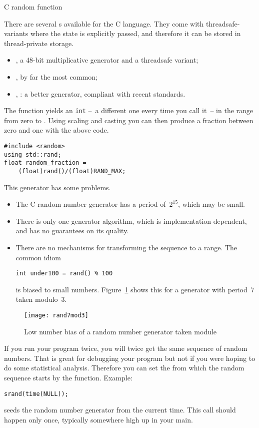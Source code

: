  {C random function}
\label{sec:crand}

There are several
s
available
for the C language.
They come with threadsafe-variants where the state is explicitly passed,
and therefore it can be stored in thread-private storage.
\begin{itemize}
\item {},  a 48-bit multiplicative generator
  and a threadsafe variant;
\item {},  by far the most common;
\item {}, : a better generator, compliant
  with recent  standards.
\end{itemize}

The function  yields an \lstinline{int}
--~a different one every time you call it~--
in the range from zero to .
Using scaling and casting you can then produce a fraction between zero
and one with the above code.
%
\begin{lstlisting}
#include <random>
using std::rand;
float random_fraction =
    (float)rand()/(float)RAND_MAX;
\end{lstlisting}
%

This generator has some problems.

\begin{itemize}
\item The C random number generator has a period of~$2^{15}$, which may be small.
\item There is only one generator algorithm, which is implementation-dependent,
  and has no guarantees on its quality.
\item There are no mechanisms for transforming the sequence to a range.
  The common idiom
\begin{lstlisting}
int under100 = rand() % 100
\end{lstlisting}
is biased to small numbers. Figure~\ref{fig:rand7mod3} shows this
for a generator with period~7 taken modulo~3.
\end{itemize}

\begin{figure}[t]
  \texttt{[image: rand7mod3]}
  \caption{Low number bias of a random number generator taken module}
  \label{fig:rand7mod3}
\end{figure}

If you run your program twice, you will twice get the same sequence of
random numbers. That is great for debugging your program but not if
you were hoping to do some statistical analysis. Therefore you can set
the  from which the random sequence
starts by the  function. Example:
\begin{lstlisting}
srand(time(NULL));
\end{lstlisting}
seeds the random number generator from the current time.
This call should happen only once, typically somewhere high up in your main.

